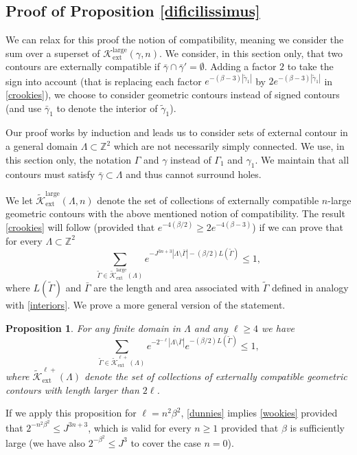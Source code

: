 \documentclass[10pt]{amsart}
\let\mathcal\mathscr
\numberwithin{equation}{section}
\theoremstyle{plain}
\newtheorem{proposition}[theorem]{Proposition}
\theoremstyle{definition}
\newcommand{\ext}{\mathrm{ext}}
\newcommand{\larg}{\mathrm{large}}
\newcommand{\cK}{{\ensuremath{\mathcal K}} }
\newcommand{\bbZ}{{\ensuremath{\mathbb Z}} }
\newcommand{\gb}{\beta}
\newcommand{\gG}{\Gamma}
\newcommand{\gL}{\Lambda}
\begin{document}
\subsection{Proof of Proposition \ref{dificilissimus}}\label{dcimus}

We can relax for this proof the notion of compatibility, meaning we consider the sum over a superset of $\cK^{\larg}_{\ext}(\gamma,n)$.
We consider, in this section only, that two contours are externally compatible if $\bar \gamma \cap \bar \gamma'=\emptyset$.
Adding a factor $2$ to take the sign into account (that is replacing each factor $e^{-(\gb-3)|\tilde \gamma_1|}$ by $2e^{-(\gb-3)|\tilde \gamma_1|}$ in \eqref{crookies}),
we choose to consider geometric contours instead of signed contours (and use $\bar \gamma_1$ to denote the interior of $\tilde \gamma_1$).

Our proof works by induction and leads us to consider sets of external contour in a general domain $\gL\subset \bbZ^2$
which are not necessarily simply connected.
We use, in this section only, the notation $\gG$ and $\gamma$ instead of $\gG_1$ and $\gamma_1$.
We maintain that all contours must satisfy $\bar \gamma\subset \gL$ and thus cannot surround holes.

We let $\tilde \cK^{\larg}_{\ext}(\gL,n)$ denote the set of collections of externally compatible $n$-large geometric contours
with the above mentioned notion of compatibility.
The result \eqref{crookies} will follow (provided that $e^{-4(\gb/2)}\ge 2e^{-4(\gb-3)}$) if we can prove that for every $\gL\subset \bbZ^2$
\begin{equation}\label{wookies}
\sum_{\tilde \gG\in \tilde \cK^{\larg}_{\ext}(\gL)} e^{-J^{3n+3} |\gL\setminus \bar \gG|-(\gb/2) L(\tilde \Gamma)}\le 1,
\end{equation}
where $L(\tilde \gG)$ and $\bar \gG$ are the length and area associated with $\tilde \gG$
defined in analogy with \eqref{interiors}.
We prove a more general version of the statement.
\begin{proposition}
For any finite domain in $\gL$ and any $\ell\ge 4$ we have
\begin{equation}\label{dunnies}
\sum_{\tilde \gG\in \tilde \cK^{\ell+}_{\ext}(\gL)} e^{-2^{-\ell} |\gL\setminus \bar \gG| }e^{-(\gb/2) L(\tilde\gG)}\le 1,
\end{equation}
where $\tilde \cK^{\ell+}_{\ext}(\gL)$ denote the set of collections of externally compatible geometric contours with length larger than $2\ell$.
\end{proposition}
If we apply this proposition for $\ell=n^2\gb^2$, \eqref{dunnies} implies \eqref{wookies} provided that
$2^{-n^2\gb^2}\le J^{3n+3}$, which is valid for every $n\ge 1$ provided that $\gb$ is sufficiently large (we have also $2^{-\gb^2}\le J^{3}$ to cover the case $n=0$).
\end{document}

